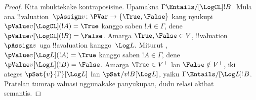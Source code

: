 \documentclass[../../../include/open-logic-section]{subfiles}
\begin{document}
\begin{proof}
  Kita mbuktekake kontraposisine. Upamakna
  $\Gamma \Entails/[\LogCL] !B$. Mula ana
  !!{valuation}~$\pAssign v\colon \PVar \to
  \{\True, \False\}$ kang nyukupi $\pValue v[\LogCL](!A) = \True$
  kanggo saben $!A \in \Gamma$, dene $\pValue v[\LogCL](!B) = \False$.
  Amarga $\True, \False \in V$, !!{valuation}~$\pAssign v$ uga
  !!a{valuation} kanggo~$\Log L$. Miturut ,
  $\pValue v[\Log L](!A) = \True$ kanggo saben $!A \in \Gamma$,
  dene $\pValue v[\Log L](!B) = \False$.
  Amarga $\True \in V^+$ lan $\False \notin V^+$,
  iki ateges $\pSat{v}{\Gamma}[\Log L]$ lan
  $\pSat/{v}{!B}[\Log L]$, yaiku
  $\Gamma \Entails/[\Log L] !B$.
Pratelan tumrap valuasi nggunakake panyukupan, dudu relasi akibat semantis.
\end{proof}
\end{document}
